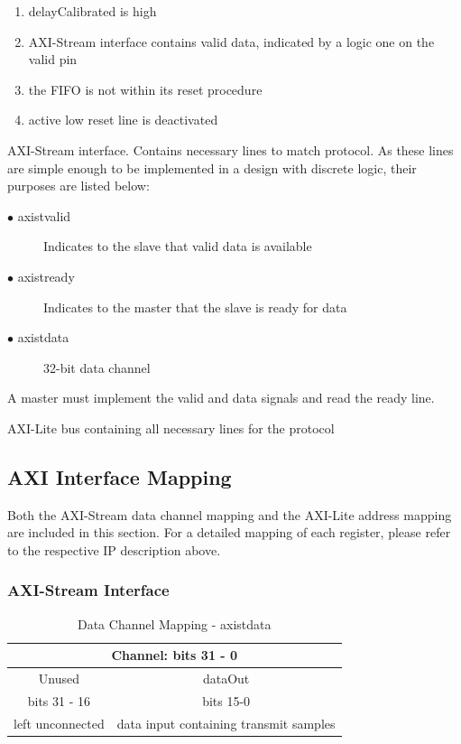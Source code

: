 \documentclass[11pt]{article}
\begin{document}
\begin{description}
\begin{enumerate}
			\item delayCalibrated is high 
			\item AXI-Stream interface contains valid data, indicated by a logic one on the valid pin
			\item the FIFO is not within its reset procedure
			\item active low reset line is deactivated
		\end{enumerate}
	\item[axis]AXI-Stream interface. Contains necessary lines to match protocol. As these lines are simple enough to be implemented in a design with
		discrete logic, their purposes are listed below:\hfill
		\begin{description}
			\item[$\bullet$ axis\textunderscore tvalid]Indicates to the slave that valid data is available
			\item[$\bullet$ axis\textunderscore tready]Indicates to the master that the slave is ready for data
			\item[$\bullet$ axis\textunderscore tdata]32-bit data channel
		\end{description}
		A master must implement the valid and data signals and read the ready line.
	\item[S00\textunderscore AXI\textunderscore 0]AXI-Lite bus containing all necessary lines for the protocol
\end{description}
\subsection{AXI Interface Mapping}
Both the AXI-Stream data channel mapping and the AXI-Lite address mapping are included in this section. For a detailed mapping of each register, please 
refer to the respective IP description above.
\subsubsection{AXI-Stream Interface}
\begin{table}[H]
	\centering
	\caption{Data Channel Mapping - axis\textunderscore tdata}
	\begin{tabular}{|c|c|}
		\toprule
		\multicolumn{2}{|c|}{\textbf{Channel: bits 31 - 0}}\\
		\midrule
		Unused&dataOut\\
		\hline
		bits 31 - 16&bits 15-0\\	
		\hline
		\multicolumn{1}{|c|}{left unconnected}&\multicolumn{1}{c|}{data input containing transmit samples}\\
		\bottomrule
	\end{tabular}
\end{table}
\end{document}
